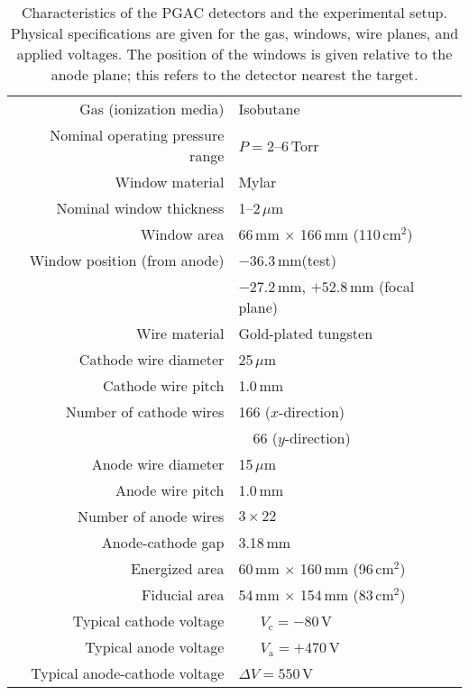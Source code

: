 \begin{table}[ht!]
\begin{center}
\begin{tabulary}{1.0\textwidth}{R|L} 
\raggedleft Gas (ionization media)&Isobutane\\
\raggedleft Nominal operating pressure range&$P=2$--6\,Torr\\
\hline
\raggedleft Window material &Mylar\\
\raggedleft Nominal window thickness&1--2\,$\mu$m\\
\raggedleft Window area& 66\,mm $\times$ 166\,mm (110\,cm$^2$)\\
\raggedleft Window position (from anode)& $-36.3$\,mm\hspace{5.4em}(test)\\
&$-27.2$\,mm,  $+52.8$\,mm (focal plane)\\
\hline
\raggedleft Wire material&Gold-plated tungsten\\
\raggedleft Cathode wire diameter&25\,$\mu$m\\
\raggedleft Cathode wire pitch&1.0\,mm\\
\raggedleft Number of cathode wires&166 ($x$-direction)\\
& ~~66 ($y$-direction)\\
\raggedleft Anode wire diameter&15\,$\mu$m\\
\raggedleft Anode wire pitch&1.0\,mm\\
\raggedleft Number of anode wires &$3\times22$\\  
\raggedleft Anode-cathode gap&3.18\,mm\\
\raggedleft Energized area&60\,mm $\times$ 160\,mm (96\,cm$^2$)\\
\raggedleft Fiducial area&54\,mm $\times$ 154\,mm (83\,cm$^2$)\\
\hline
\raggedleft Typical cathode voltage & ~~~$V_\textrm{c}=-80$\,V\\
\raggedleft Typical anode voltage & ~~~$V_\textrm{a}=+470$\,V\\
\raggedleft Typical anode-cathode voltage &$\Delta V=550$\,V\\
\end{tabulary}
\end{center}
\caption{Characteristics of the PGAC detectors and the experimental setup. Physical specifications are given for the gas, windows, wire planes, and applied voltages. The position of the windows is given relative to the anode plane; this refers to the detector nearest the target.}
\label{detector_specs}
\end{table}

